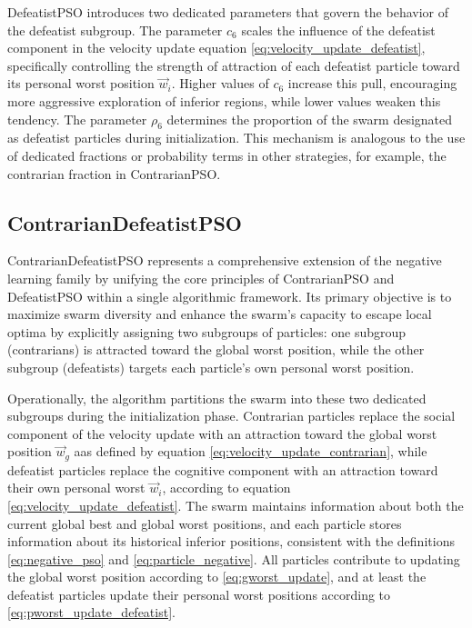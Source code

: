 {DefeatistPSO introduces two dedicated parameters that govern the behavior of the defeatist subgroup. The parameter  $c_6$ scales the influence of the defeatist component in the velocity update equation \eqref{eq:velocity_update_defeatist}, specifically controlling the strength of attraction of each defeatist particle toward its personal worst position $\vec{w}_i$. Higher values of $c_6$ increase this pull, encouraging more aggressive exploration of inferior regions, while lower values weaken this tendency.
The parameter $\rho_6$ determines the proportion of the swarm designated as defeatist particles during initialization. This mechanism is analogous to the use of dedicated fractions or probability terms in other strategies, for example, the contrarian fraction in ContrarianPSO.


\subsection{ContrarianDefeatistPSO}

ContrarianDefeatistPSO represents a comprehensive extension of the negative learning family by unifying the core principles of ContrarianPSO and DefeatistPSO within a single algorithmic framework. Its primary objective is to maximize swarm diversity and enhance the swarm’s capacity to escape local optima by explicitly assigning two subgroups of particles: one subgroup (contrarians) is attracted toward the global worst position, while the other subgroup (defeatists) targets each particle’s own personal worst position.

Operationally, the algorithm partitions the swarm into these two dedicated subgroups during the initialization phase. Contrarian particles replace the social component of the velocity update with an attraction toward the global worst position $\vec{w}_g$ aas defined by equation \eqref{eq:velocity_update_contrarian}, while defeatist particles replace the cognitive component with an attraction toward their own personal worst $\vec{w}_i$, according to equation \eqref{eq:velocity_update_defeatist}.
The swarm maintains information about both the current global best and global worst positions, and each particle stores information about its historical inferior positions, consistent with the definitions \eqref{eq:negative_pso} and \eqref{eq:particle_negative}. All particles contribute to updating the global worst position according to \eqref{eq:gworst_update}, and at least the defeatist particles update their personal worst positions according to \eqref{eq:pworst_update_defeatist}.

}
